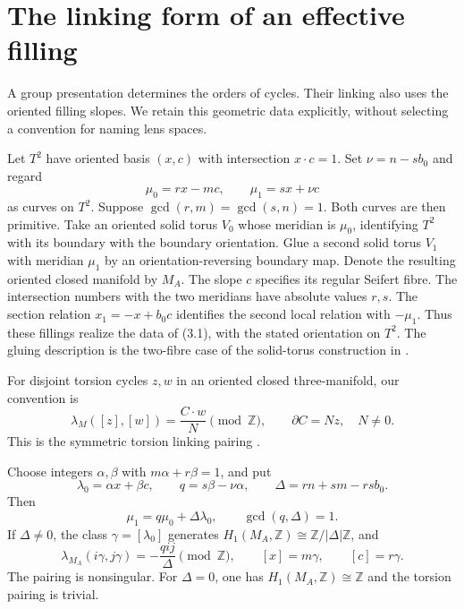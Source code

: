 \documentclass[11pt]{article}
\numberwithin{equation}{section}
\begin{document}
\section{The linking form of an effective filling}

A group presentation determines the orders of cycles.  Their linking
also uses the oriented filling slopes.  We retain this geometric data
explicitly, without selecting a convention for naming lens spaces.

Let $T^2$ have oriented basis $(x,c)$ with intersection $x\cdot c=1$.
Set $\nu=n-sb_0$ and regard
\begin{equation}\label{eq:filling-slopes}
       \mu_0=rx-mc,\qquad \mu_1=sx+\nu c
\end{equation}
as curves on $T^2$.  Suppose
$\gcd(r,m)=\gcd(s,n)=1$.  Both curves are then primitive.
Take an oriented solid torus $V_0$ whose meridian is $\mu_0$, identifying
$T^2$ with its boundary with the boundary orientation.
Glue a second solid torus $V_1$ with meridian $\mu_1$ by an
orientation-reversing boundary map.  Denote the resulting oriented
closed manifold by $M_A$.
The slope $c$ specifies its regular Seifert fibre.  The intersection
numbers with the two meridians have absolute values $r,s$.
The section relation $x_1=-x+b_0c$ identifies the second local
relation with $-\mu_1$.  Thus these fillings realize the data of (3.1),
with the stated orientation on $T^2$.
The gluing description is the two-fibre case of the solid-torus
construction in \cite[Section~2.1, pp.~25--27]{Hatcher}.

For disjoint torsion cycles $z,w$ in an oriented closed three-manifold,
our convention is
\[
 \lambda_M([z],[w])=\frac{C\cdot w}{N}\pmod{\mathbb Z},
             \qquad \partial C=Nz,\quad N\ne0.
\]
This is the symmetric torsion linking pairing
\cite[Section~1, pp.~2--3]{Hillman}.

\begin{theorem}\label{thm:linking}
Choose integers $\alpha,\beta$ with $m\alpha+r\beta=1$, and put
\begin{equation}\label{eq:linking-coordinates}
 \lambda_0=\alpha x+\beta c,\qquad
 q=s\beta-\nu\alpha,\qquad \Delta=rn+sm-rsb_0.
\end{equation}
Then
\[
       \mu_1=q\mu_0+\Delta\lambda_0,\qquad
       \gcd(q,\Delta)=1.
\]
If $\Delta\ne0$, the class $\gamma=[\lambda_0]$ generates
$H_1(M_A,\mathbb Z)\cong\mathbb Z/|\Delta|\mathbb Z$, and
\begin{equation}\label{eq:linking-formula}
 \lambda_{M_A}(i\gamma,j\gamma)=-\frac{qij}{\Delta}
            \pmod{\mathbb Z},\qquad
 [x]=m\gamma,\qquad[c]=r\gamma.
\end{equation}
The pairing is nonsingular.  For $\Delta=0$, one has
$H_1(M_A,\mathbb Z)\cong\mathbb Z$ and the torsion pairing is trivial.
\end{theorem}
\end{document}
